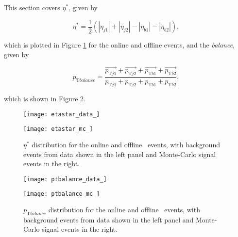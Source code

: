     This section covers $\eta^*$, given by

    \begin{equation}
    \eta^* = \frac{1}{2}(|\eta_{j1}| + |\eta_{j2}| - |\eta_{b1}| - |\eta_{b2}|),
    \end{equation}

    which is plotted in Figure \ref{f:etastar} for the online and offline events, and the \pt\textit{balance}, given by

    \begin{equation}
        p_{\text{T} balance} = \frac{\vec{p_{\text{T}j1}} + \vec{p_{\text{T}j2}} + \vec{p_{\text{T}b1}} + \vec{p_{\text{T}b2}}}{p_{\text{T}j1} + p_{\text{T}j2} + p_{\text{T}b1} + p_{\text{T}b2}},
    \end{equation}

    which is shown in Figure \ref{f:ptbalance}.

    \begin{figure}[h]
        \centering
        \begin{minipage}[h]{0.48\linewidth}
            \texttt{[image: etastar\_data\_]}
        \end{minipage}
        \quad
        \begin{minipage}[h]{0.48\linewidth}
            \texttt{[image: etastar\_mc\_]}
        \end{minipage}
        \caption[Comparison of the $\eta^*$ distribution of the \VBFHBB\ events for HLT and offline objects]{$\eta^*$ distribution for the online and offline \VBFHBB\ events, with background events from data shown in the left panel and Monte-Carlo signal events in the right.}
        \label{f:etastar}
    \end{figure}

    \begin{figure}[h]
        \centering
        \begin{minipage}[h]{0.48\linewidth}
            \texttt{[image: ptbalance\_data\_]}
        \end{minipage}
        \quad
        \begin{minipage}[h]{0.48\linewidth}
            \texttt{[image: ptbalance\_mc\_]}
        \end{minipage}
        \caption[Comparison of the $p_{\text{T} balance}$ distribution of the \VBFHBB\ events for HLT and offline objects]{$p_{\text{T} balance}$ distribution for the online and offline \VBFHBB\ events, with background events from data shown in the left panel and Monte-Carlo signal events in the right.}
        \label{f:ptbalance}
    \end{figure}

